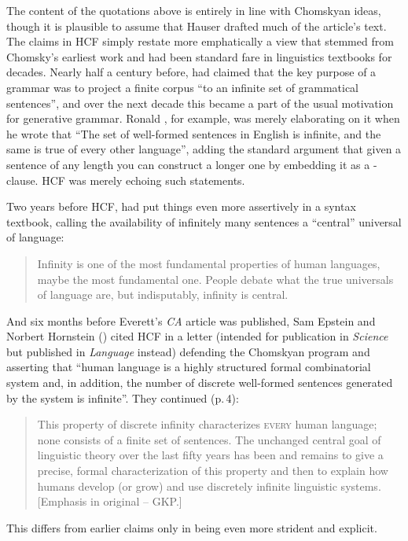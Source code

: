 \documentclass[output=paper,colorlinks,citecolor=brown
]{langscibook}
\begin{document}
The content of the quotations above is entirely in line with Chomskyan
ideas, though it is plausible to assume that Hauser drafted much of the
article's text. The claims in HCF simply restate more emphatically a
view that stemmed from Chomsky's earliest work and had been standard
fare in linguistics textbooks for decades. Nearly half a century before,
\citet[113]{Chomsky56} had claimed that the key purpose
of a grammar was to project a finite corpus ``to an infinite set of
grammatical sentences'', and over the next decade this became a part
of the usual motivation for generative grammar. Ronald \citet[31]{Langacker68}, for example, was merely elaborating on
it when he wrote that ``The set of well-formed sentences in English
is infinite, and the same is true of every other language'', adding
the standard argument that given a sentence of any length you can
construct a longer one by embedding it as a -clause.
HCF was merely echoing such statements.

Two years before HCF, \citet[3]{Lasnik00} had put things
even more assertively in a syntax textbook, calling the availability
of infinitely many sentences a ``central'' universal of language:
\begin{quote}
Infinity is one of the most fundamental properties of human languages,
maybe the most fundamental one. People debate what the true universals
of language are, but indisputably, infinity is central.
\end{quote}
And six months before Everett's \textit{CA} article was published,
Sam Epstein and Norbert Hornstein (\citeyear{EpstHorn05}) cited HCF in
a letter (intended for publication in \textit{Science} but published
in \textit{Language} instead) defending the Chomskyan program and asserting
that ``human language is a highly structured formal combinatorial system
and, in addition, the number of discrete well-formed sentences generated
by the system is infinite''. They continued (p.\,4):
\begin{quote}
This property of discrete infinity characterizes \mbox{\textsc{every}}
human language; none consists of a finite set of sentences. The unchanged
central goal of linguistic theory over the last fifty years has been and
remains to give a precise, formal characterization of this property and
then to explain how humans develop (or grow) and use discretely infinite
linguistic systems. [Emphasis in original -- GKP.]
\end{quote}
This differs from earlier claims only in being even more strident and
explicit.
\end{document}
